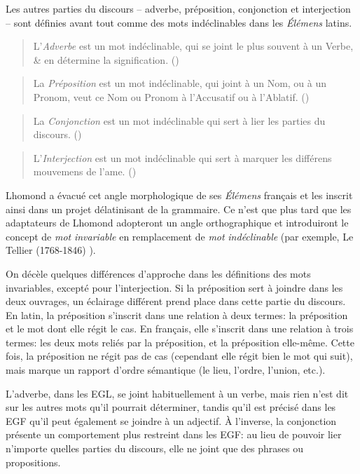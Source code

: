 \documentclass[output=paper]{langsci/langscibook}
\begin{document}
Les autres parties du discours – adverbe, préposition, conjonction et interjection – sont définies avant tout comme des mots indéclinables dans les \textit{Élémens} latins. 

\begin{quote}
    L’\textit{Adverbe} est un mot indéclinable, qui se joint le plus souvent à un Verbe, \& en détermine la signification. (\citealt[92]{lhomond_elemens_1781})
\end{quote}

\begin{quote}
    La \textit{Préposition} est un mot indéclinable, qui joint à un Nom, ou à un Pronom, veut ce Nom ou Pronom à l’Accusatif ou à l’Ablatif. (\citealt[94]{lhomond_elemens_1781})
\end{quote}

\begin{quote}    
    La \textit{Conjonction} est un mot indéclinable qui sert à lier les parties du discours. (\citealt[96]{lhomond_elemens_1781})
\end{quote}

\begin{quote}
    L’\textit{Interjection} est un mot indéclinable qui sert à marquer les différens mouvemens de l’ame. (\citealt[97]{lhomond_elemens_1781})
\end{quote}

Lhomond a évacué cet angle morphologique de ses \textit{Élémens} français et les inscrit ainsi dans un projet délatinisant de la grammaire. Ce n’est que plus tard que les adaptateurs de Lhomond adopteront un angle orthographique et introduiront le concept de \textit{mot} \textit{invariable} en remplacement de \textit{mot} \textit{indéclinable} (par exemple, Le Tellier (1768-1846) \citeyear{le_tellier_grammaire_1811}).

On décèle quelques différences d’approche dans les définitions des mots invariables, excepté pour l’interjection. Si la préposition sert à joindre dans les deux ouvrages, un éclairage différent prend place dans cette partie du discours. En latin, la préposition s’inscrit dans une relation à deux termes: la préposition et le mot dont elle régit le cas. En français, elle s’inscrit dans une relation à trois termes: les deux mots reliés par la préposition, et la préposition elle-même. Cette fois, la préposition ne régit pas de cas (cependant elle régit bien le mot qui suit), mais marque un rapport d’ordre sémantique (le lieu, l’ordre, l’union, etc.). 

L’adverbe, dans les EGL, se joint habituellement à un verbe, mais rien n’est dit sur les autres mots qu’il pourrait déterminer, tandis qu’il est précisé dans les EGF qu’il peut également se joindre à un adjectif. À l’inverse, la conjonction présente un comportement plus restreint dans les EGF: au lieu de pouvoir lier n’importe quelles parties du discours, elle ne joint que des phrases ou propositions.
\end{document}
